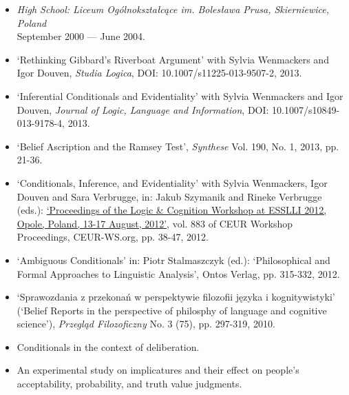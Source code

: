 \documentclass[a4paper,12pt]{article}
\begin{document}
\begin{small}
\begin{itemize}
  \item \emph{High School: Liceum Ogólnokształcące im. Bolesława
      Prusa, Skierniewice, Poland}\\
    September 2000 --- June 2004.

  \end{itemize}


  \begin{itemize}
    \item `Rethinking Gibbard's Riverboat Argument' with Sylvia
    Wenmackers and Igor Douven, \emph{Studia Logica}, DOI: 10.1007/s11225-013-9507-2, 2013.

   \item `Inferential Conditionals and Evidentiality' with Sylvia
    Wenmackers and Igor Douven, \emph{Journal of Logic, Language and Information}, DOI: 10.1007/s10849-013-9178-4, 2013.

  \item `Belief Ascription and the Ramsey Test', \emph{Synthese}
    Vol. 190, No. 1, 2013, pp. 21-36. %

  \item `Conditionals, Inference, and Evidentiality' with Sylvia
    Wenmackers, Igor Douven and Sara Verbrugge, in: Jakub Szymanik and
    Rineke Verbrugge (eds.):
    \href{http://ceur-ws.org/Vol-883/}{`Proceedings of the Logic \&
      Cognition Workshop at ESSLLI 2012, Opole, Poland, 13-17 August,
      2012'}, vol. 883 of CEUR Workshop Proceedings, CEUR-WS.org,
    pp. 38-47, 2012.

  \item `Ambiguous Conditionals' in: Piotr Stalmaszczyk (ed.):
    `Philosophical and Formal Approaches to Linguistic Analysis',
    Ontos Verlag, pp. 315-332, 2012.

  \item `Sprawozdania z przekonań w perspektywie filozofii języka i
    kognitywistyki' (`Belief Reports in the perspective of philosphy
    of language and cognitive science'), \emph{Przegląd Filozoficzny}
    No. 3 (75), pp. 297-319, 2010.

  \end{itemize}

  \begin{itemize}
   \item Conditionals in the context of deliberation.
   \item An experimental study on implicatures and their effect on people's acceptability, probability, and truth value judgments.
  \end{itemize}
  


\end{small}
\end{document}
